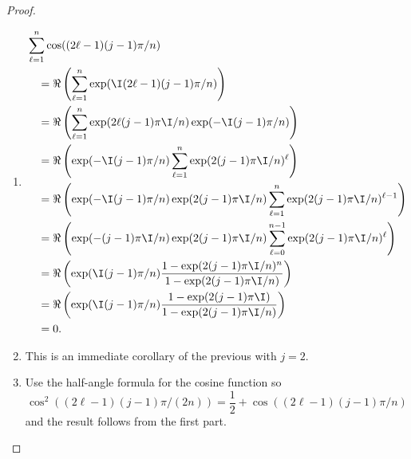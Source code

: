 \documentclass[12pt]{article}
\begin{document}
\begin{proof}
    \begin{enumerate}
        \item
            \begin{align*}
              &\sum_{\ell=1}^{n} \cos((2\ell-1)(j-1)\pi/n) \\
              &\quad =  \Re \left
                ( \sum_{\ell=1}^n \exp (\I (2\ell-1)(j-1)\pi/n) \right)
                \\
                &\quad =  \Re \left( \sum_{\ell=1}^n \exp(2\ell(j-1)\pi\I /n)
                \exp(-\I (j-1)\pi/n) \right) \\
                &\quad =  \Re \left( \exp(-\I(j-1)\pi/n) \sum_{\ell=1}^n \exp(2
                (j-1)\pi \I/n)^\ell \right) \\
                &\quad =  \Re \left( \exp(-\I(j-1)\pi/n) \exp( 2 (j-1)\pi \I/n)
                \sum_{\ell=1}^{n} \exp( 2 (j-1)\pi \I/n)^{\ell-1} \right)
                \\
                &\quad =  \Re \left( \exp(-(j-1)\pi\I/n) \exp(2 (j-1)\pi \I/n)
                \sum_{\ell=0}^{n-1} \exp( 2 (j-1)\pi \I/n)^{\ell} \right)
                \\
                &\quad =  \Re \left( \exp(\I (j-1)\pi/n) \frac{1 - \exp( 2 (j-1)\pi
                \I /n)^n}{1 - \exp ( 2(j-1)\pi \I/n)} \right) \\
                &\quad =  \Re \left( \exp(\I (j-1)\pi/n) \frac{1 - \exp(2 (j-1)\pi
                \I)}{1 - \exp(2 (j-1)\pi \I/n)} \right) \\
                &\quad =  0.
            \end{align*}
        \item
            This is an immediate corollary of the previous with \( j=2 \).
        \item
            Use the half-angle formula for the cosine function so
            \[
                \cos^2((2 \ell-1)(j-1)\pi/(2n)) = \frac{1}{2} + \cos((2
                \ell-1)(j-1)\pi/n)
            \] and the result follows from the first part.
    \end{enumerate}

\end{proof}
\end{document}
